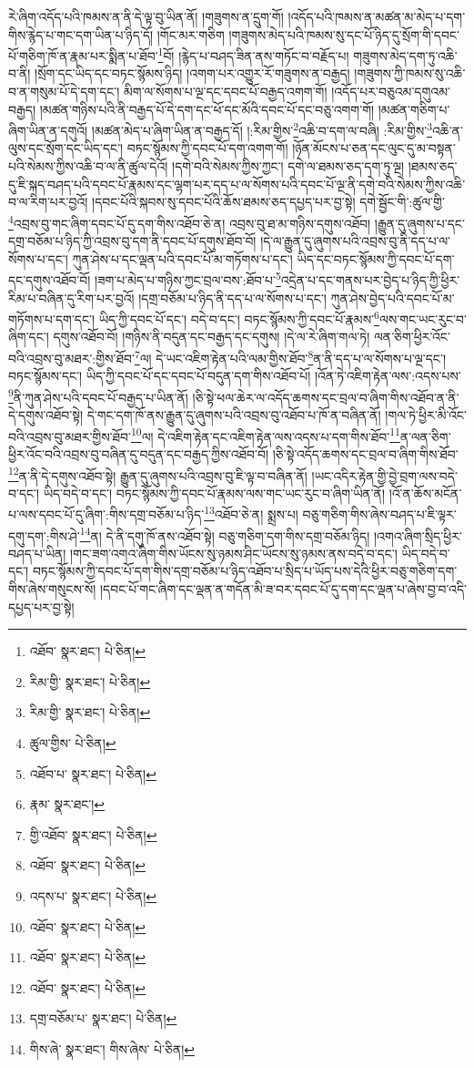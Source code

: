 རེ་ཞིག་འདོད་པའི་ཁམས་ན་ནི་དེ་ལྟ་བུ་ཡིན་ནོ། །གཟུགས་ན་དྲུག་གོ། །འདོད་པའི་ཁམས་ན་མཚན་མ་མེད་པ་དག་གིས་རྙེད་པ་གང་དག་ཡིན་པ་ཉིད་དོ། །གོང་མར་གཅིག །གཟུགས་མེད་པའི་ཁམས་སུ་དང་པོ་ཉིད་དུ་སྲོག་གི་དབང་པོ་གཅིག་ཁོ་ན་རྣམ་པར་སྨིན་པ་ཐོབ་\footnote{འཐོབ་  སྣར་ཐང་།  པེ་ཅིན། }བོ། །རྙེད་པ་བཤད་ཟིན་ནས་གཏོང་བ་བརྗོད་པ། གཟུགས་མེད་དག་ཏུ་འཆི་བ་ནི། །སྲོག་དང་ཡིད་དང་བཏང་སྙོམས་ཉིད། །འགག་པར་འགྱུར་རོ་གཟུགས་ན་བརྒྱད། །གཟུགས་ཀྱི་ཁམས་སུ་འཆི་བ་ན་གསུམ་པོ་དེ་དག་དང་། མིག་ལ་སོགས་པ་ལྔ་དང་དབང་པོ་བརྒྱད་འགག་གོ། །འདོད་པར་བཅུའམ་དགུའམ་བརྒྱད། །མཚན་གཉིས་པའི་ནི་བརྒྱད་པོ་དེ་དག་དང་ཕོ་དང་མོའི་དབང་པོ་དང་བཅུ་འགག་གོ། །མཚན་གཅིག་པ་ཞིག་ཡིན་ན་དགུའོ། །མཚན་མེད་པ་ཞིག་ཡིན་ན་བརྒྱད་དོ། །:རིམ་གྱིས་\footnote{རིམ་གྱི་  སྣར་ཐང་།  པེ་ཅིན། }འཆི་བ་དག་ལ་བཞི། :རིམ་གྱིས་\footnote{རིམ་གྱི་  སྣར་ཐང་།  པེ་ཅིན། }འཆི་ན་ལུས་དང་སྲོག་དང་ཡིད་དང་། བཏང་སྙོམས་ཀྱི་དབང་པོ་དག་འགག་གོ། །ཉོན་མོངས་པ་ཅན་དང་ལུང་དུ་མ་བསྟན་པའི་སེམས་ཀྱིས་འཆི་བ་ལ་ནི་ཚུལ་དེའོ། །དགེ་བའི་སེམས་ཀྱིས་ཀྱང་། དགེ་ལ་ཐམས་ཅད་དག་ཏུ་ལྔ། །ཐམས་ཅད་དུ་ཇི་སྐད་བཤད་པའི་དབང་པོ་རྣམས་དང་ལྷག་པར་དད་པ་ལ་སོགས་པའི་དབང་པོ་ལྔ་ནི་དགེ་བའི་སེམས་ཀྱིས་འཆི་བ་ལ་རིག་པར་བྱའོ། །དབང་པོའི་སྐབས་སུ་དབང་པོའི་ཆོས་ཐམས་ཅད་དཔྱད་པར་བྱ་སྟེ། དགེ་སྦྱོང་གི་:ཚུལ་གྱི་\footnote{ཚུལ་གྱིས་  པེ་ཅིན། }འབྲས་བུ་གང་ཞིག་དབང་པོ་དུ་དག་གིས་འཐོབ་ཅེ་ན། འབྲས་བུ་ཐ་མ་གཉིས་དགུས་འཐོབ། །རྒྱུན་དུ་ཞུགས་པ་དང་དགྲ་བཅོམ་པ་ཉིད་ཀྱི་འབྲས་བུ་དག་ནི་དབང་པོ་དགུས་ཐོབ་བོ། །དེ་ལ་རྒྱུན་དུ་ཞུགས་པའི་འབྲས་བུ་ནི་དད་པ་ལ་སོགས་པ་དང་། ཀུན་ཤེས་པ་དང་ལྡན་པའི་དབང་པོ་མ་གཏོགས་པ་དང་། ཡིད་དང་བཏང་སྙོམས་ཀྱི་དབང་པོ་དག་དང་དགུས་འཐོབ་བོ། །ཟག་པ་མེད་པ་གཉིས་ཀྱང་བྲལ་བས་:ཐོབ་པ་\footnote{འཐོབ་པ་  སྣར་ཐང་།  པེ་ཅིན། }འདྲེན་པ་དང་གནས་པར་བྱེད་པ་ཉིད་ཀྱི་ཕྱིར་རིམ་པ་བཞིན་དུ་རིག་པར་བྱའོ། །དགྲ་བཅོམ་པ་ཉིད་ནི་དད་པ་ལ་སོགས་པ་དང་། ཀུན་ཤེས་བྱེད་པའི་དབང་པོ་མ་གཏོགས་པ་དག་དང་། ཡིད་ཀྱི་དབང་པོ་དང་། བདེ་བ་དང་། བཏང་སྙོམས་ཀྱི་དབང་པོ་རྣམས་\footnote{རྣམ་  སྣར་ཐང་། }ལས་གང་ཡང་རུང་བ་ཞིག་དང་། དགུས་འཐོབ་བོ། །གཉིས་ནི་བདུན་དང་བརྒྱད་དང་དགུས། །དེ་ལ་རེ་ཞིག་གལ་ཏེ། ལན་ཅིག་ཕྱིར་འོང་བའི་འབྲས་བུ་མཐར་:གྱིས་ཐོབ་\footnote{གྱི་འཐོབ་  སྣར་ཐང་།  པེ་ཅིན། }ལ། དེ་ཡང་འཇིག་རྟེན་པའི་ལམ་གྱིས་ཐོབ་\footnote{འཐོབ་  སྣར་ཐང་།  པེ་ཅིན། }ན་ནི་དད་པ་ལ་སོགས་པ་ལྔ་དང་། བཏང་སྙོམས་དང་། ཡིད་ཀྱི་དབང་པོ་དང་དབང་པོ་བདུན་དག་གིས་འཐོབ་པོ། །འོན་ཏེ་འཇིག་རྟེན་ལས་:འདས་པས་\footnote{འདས་པ་  སྣར་ཐང་།  པེ་ཅིན། }ནི་ཀུན་ཤེས་པའི་དབང་པོ་བརྒྱད་པ་ཡིན་ནོ། །ཅི་སྟེ་ཕལ་ཆེར་ལ་འདོད་ཆགས་དང་བྲལ་བ་ཞིག་གིས་འཐོབ་ན་ནི་དེ་དགུས་འཐོབ་སྟེ། དེ་གང་དག་ཁོ་ནས་རྒྱུན་དུ་ཞུགས་པའི་འབྲས་བུ་འཐོབ་པ་ཁོ་ན་བཞིན་ནོ། །གལ་ཏེ་ཕྱིར་མི་འོང་བའི་འབྲས་བུ་མཐར་གྱིས་ཐོབ་\footnote{འཐོབ་  སྣར་ཐང་།  པེ་ཅིན། }ལ། དེ་འཇིག་རྟེན་དང་འཇིག་རྟེན་ལས་འདས་པ་དག་གིས་ཐོབ་\footnote{འཐོབ་  སྣར་ཐང་།  པེ་ཅིན། }ན་ལན་ཅིག་ཕྱིར་འོང་བའི་འབྲས་བུ་བཞིན་དུ་བདུན་དང་བརྒྱད་ཀྱིས་འཐོབ་བོ། །ཅི་སྟེ་འདོད་ཆགས་དང་བྲལ་བ་ཞིག་གིས་ཐོབ་\footnote{འཐོབ་  སྣར་ཐང་།  པེ་ཅིན། }ན་ནི་དེ་དགུས་འཐོབ་སྟེ། རྒྱུན་དུ་ཞུགས་པའི་འབྲས་བུ་ཇི་ལྟ་བ་བཞིན་ནོ། །ཡང་འདིར་རྟེན་གྱི་བྱེ་བྲག་ལས་བདེ་བ་དང་། ཡིད་བདེ་བ་དང་། བཏང་སྙོམས་ཀྱི་དབང་པོ་རྣམས་ལས་གང་ཡང་རུང་བ་ཞིག་ཡིན་ནོ། །འོ་ན་ཆོས་མངོན་པ་ལས་དབང་པོ་དུ་ཞིག་:གིས་དགྲ་བཅོམ་པ་ཉིད་\footnote{དགྲ་བཅོམ་པ་  སྣར་ཐང་།  པེ་ཅིན། }འཐོབ་ཅེ་ན། སྨྲས་པ། བཅུ་གཅིག་གིས་ཞེས་བཤད་པ་ཇི་ལྟར་དགུ་དག་:གིས་ཤེ་\footnote{གིས་ཞེ་  སྣར་ཐང་། གིས་ཞེས་  པེ་ཅིན། }ན། དེ་ནི་དགུ་ཁོ་ནས་འཐོབ་སྟེ། བཅུ་གཅིག་དག་གིས་དགྲ་བཅོམ་ཉིད། །འགའ་ཞིག་སྲིད་ཕྱིར་བཤད་པ་ཡིན། །གང་ཟག་འགའ་ཞིག་གིས་ཡོངས་སུ་ཉམས་ཤིང་ཡོངས་སུ་ཉམས་ནས་བདེ་བ་དང་། ཡིད་བདེ་བ་དང་། བཏང་སྙོམས་ཀྱི་དབང་པོ་དག་གིས་དགྲ་བཅོམ་པ་ཉིད་འཐོབ་པ་སྲིད་པ་ཡོད་པས་དེའི་ཕྱིར་བཅུ་གཅིག་དག་གིས་ཞེས་གསུངས་སོ། །དབང་པོ་གང་ཞིག་དང་ལྡན་ན་གདོན་མི་ཟ་བར་དབང་པོ་དུ་དག་དང་ལྡན་པ་ཞེས་བྱ་བ་འདི་དཔྱད་པར་བྱ་སྟེ། 